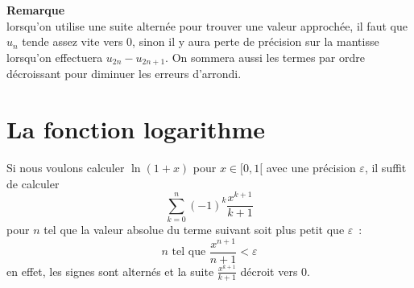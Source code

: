 \documentclass[a4paper,11pt]{book}
\begin{document}
\begin{giacjshere}
{\bf Remarque}\\
lorsqu'on utilise une suite altern\'ee pour
trouver une valeur approch\'ee, il faut que $u_n$ tende assez
vite vers 0, sinon il y aura perte de pr\'ecision sur la mantisse
lorsqu'on effectuera $u_{2n}-u_{2n+1}$. On sommera aussi les termes
par ordre d\'ecroissant pour diminuer les erreurs d'arrondi.

\section{La fonction logarithme}
Si nous voulons calculer $\ln(1+x)$ pour $x \in [0,1[$ avec une
pr\'ecision $\varepsilon$, il suffit de calculer
\[ \sum_{k=0}^n (-1)^k \frac{x^{k+1}}{k+1}\]
pour $n$ tel que la valeur absolue du terme suivant soit plus petit 
que $\varepsilon$~:
\[ n \mbox{ tel que } \frac{x^{n+1}}{n+1} < \varepsilon \]
en effet, les signes sont altern\'es et la suite $\frac{x^{k+1}}{k+1}$
d\'ecroit vers 0.


\end{giacjshere}
\end{document}

